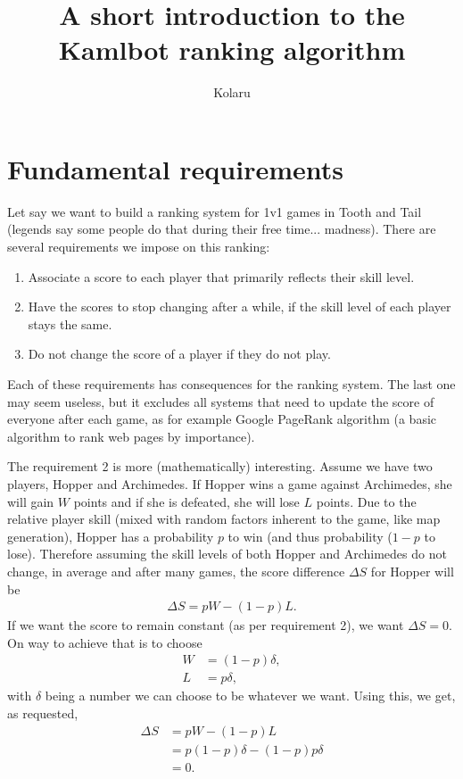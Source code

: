 \documentclass[twocolumn]{article}
\title{A short introduction to the Kamlbot ranking algorithm}
\author{Kolaru}
\begin{document}
\maketitle

\section{Fundamental requirements}

Let say we want to build a ranking system for 1v1 games in Tooth and Tail (legends say some people do that during their free time... madness). There are several requirements we impose on this ranking:

\begin{enumerate}
	\item Associate a score to each player that primarily reflects their skill level.
	\item Have the scores to stop changing after a while, if the skill level of each player stays the same.
	\item Do not change the score of a player if they do not play.
\end{enumerate}

Each of these requirements has consequences for the ranking system. The last one may seem useless, but it excludes all systems that need to update the score of everyone after each game, as for example Google PageRank algorithm (a basic algorithm to rank web pages by importance).

The requirement 2 is more (mathematically) interesting. Assume we have two players, Hopper and Archimedes. If Hopper wins a game against Archimedes, she will gain $W$ points and if she is defeated, she will lose $L$ points. Due to the relative player skill (mixed with random factors inherent to the game, like map generation), Hopper has a probability $p$ to win (and thus probability ($1 - p$ to lose). Therefore assuming the skill levels of both Hopper and Archimedes do not change, in average and after many games, the score difference $\Delta S$ for Hopper will be
\begin{align}
	\Delta S = p W - (1 - p) L.
\end{align}
If we want the score to remain constant (as per requirement 2), we want $\Delta S = 0$. On way to achieve that is to choose
\begin{align}
	W &= (1 - p) \delta, \\
	L &= p \delta,
\end{align}
with $\delta$ being a number we can choose to be whatever we want. Using this, we get, as requested,
\begin{align}
	\Delta S &= p W - (1 - p) L \\
		&= p (1 - p) \delta - (1 - p) p \delta \\
		&= 0.
\end{align}
\end{document}
